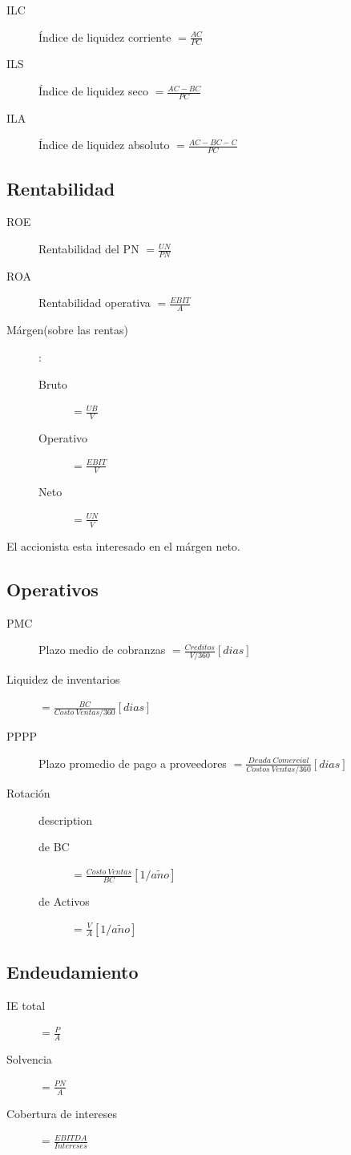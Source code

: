 \documentclass[twocolumn,10pt]{article}
\begin{document}
\begin{description}
	\item[ILC] Índice de liquidez corriente $=\frac{AC}{PC}$
	\item[ILS] Índice de liquidez seco $=\frac{AC-BC}{PC}$
	\item[ILA] Índice de liquidez absoluto $=\frac{AC-BC-C}{PC}$
\end{description}

\subsection{Rentabilidad}
\begin{description}
	\item[ROE] Rentabilidad del PN $=\frac{UN}{PN}$
	\item[ROA] Rentabilidad operativa $=\frac{EBIT}{A}$
	\item[Márgen(sobre las rentas)]:
	\begingroup
	\small
	\begin{description}
		\item[Bruto] $=\frac{UB}{V}$
		\item[Operativo] $=\frac{EBIT}{V}$
		\item[Neto] $=\frac{UN}{V}$
	\end{description}
	\endgroup
\end{description}
El accionista esta interesado en el márgen neto. 
\subsection{Operativos}
\begin{description}
	\item[PMC] Plazo medio de cobranzas $=\frac{Creditos}{V/360}[dias]$
	\item[Liquidez de inventarios]  $=\frac{BC}{Costo~Ventas/360} [dias]$
	\item[PPPP] Plazo promedio de pago a proveedores $=\frac{Deuda~Comercial}{Costos~Ventas/360}[dias]$ 
	\item[Rotación] description
	\begingroup
	\small
	\begin{description}
		\item[de BC] $=\frac{Costo~Ventas}{BC}[1/a\tilde{n}o]$
		\item[de Activos] $=\frac{V}{A}[1/a\tilde{n}o]$
	\end{description}
	\endgroup
\end{description}

\subsection{Endeudamiento}
\begin{description}
	\item[IE total] $=\frac{P}{A}$
	\item[Solvencia] $=\frac{PN}{A}$
	\item[Cobertura de intereses] $=\frac{EBITDA}{Intereses}$
\end{description}
\end{document}
